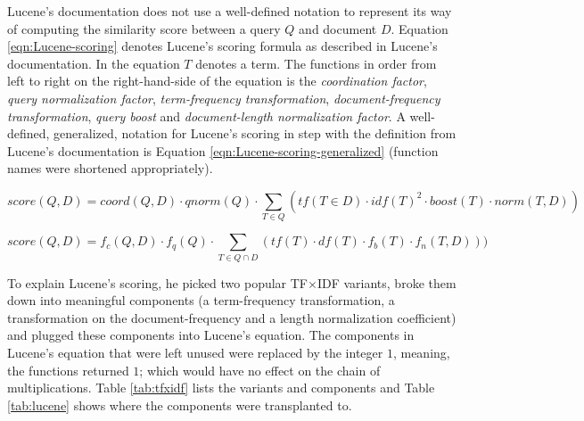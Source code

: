 Lucene's documentation does not use a well-defined notation to
represent its way of computing the similarity score between a query
$Q$ and document $D$. Equation \eqref{eqn:Lucene-scoring} denotes
Lucene's scoring formula as described in Lucene's documentation. In
the equation $T$ denotes a term. The functions in order from left to
right on the right-hand-side of the equation is the \emph{coordination
  factor}, \emph{query normalization factor}, \emph{term-frequency
  transformation}, \emph{document-frequency transformation},
\emph{query boost} and \emph{document-length normalization factor}. A
well-defined, generalized, notation for Lucene's scoring in step with
the definition from Lucene's documentation is Equation
\eqref{eqn:Lucene-scoring-generalized} (function names were shortened
appropriately).

\begin{equation}
  score(Q,D) = coord(Q,D) \cdot qnorm(Q) \cdot \displaystyle\sum_{T \in Q} (tf(T \in D) \cdot idf(T)^2 \cdot boost(T) \cdot norm(T,D))
  \label{eqn:Lucene-scoring}
\end{equation}

\begin{equation}
  score(Q,D) = f_{c}(Q,D) \cdot f_{q}(Q) \cdot \displaystyle\sum_{T \in Q \cap D}(tf(T) \cdot df(T) \cdot f_{b}(T) \cdot f_{n}(T,D)))
  \label{eqn:Lucene-scoring-generalized}
\end{equation}

To explain Lucene's scoring, he picked two popular TF$\times$IDF
variants, broke them down into meaningful components (a term-frequency
transformation, a transformation on the document-frequency and a
length normalization coefficient) and plugged these components into
Lucene's equation. The components in Lucene's equation that were left
unused were replaced by the integer $1$, meaning, the functions
returned $1$; which would have no effect on the chain of
multiplications. Table \ref{tab:tfxidf} lists the variants and
components and Table \ref{tab:lucene} shows where the components were
transplanted to.

